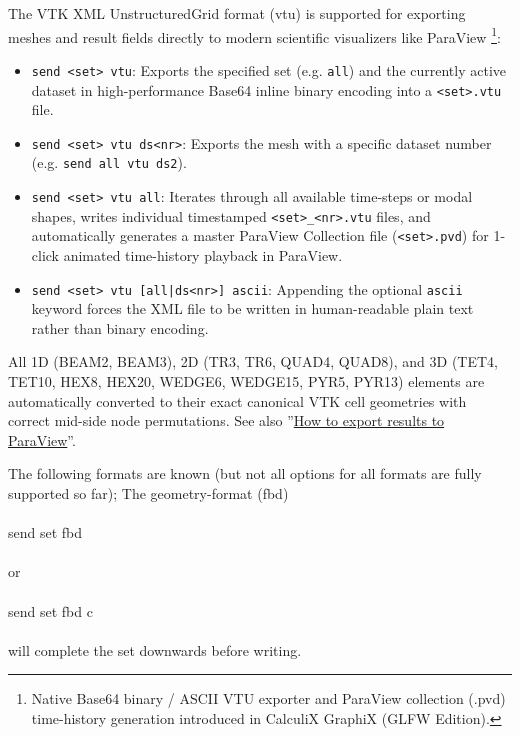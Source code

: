 \documentclass{article}
\providecommand{\htmlref}[2]{\hyperref[#2]{#1}}
\begin{document}
The VTK XML UnstructuredGrid format (vtu) is supported for exporting meshes and result fields directly to modern scientific visualizers like ParaView \cite{paraview}\footnote{Native Base64 binary / ASCII VTU exporter and ParaView collection (.pvd) time-history generation introduced in CalculiX GraphiX (GLFW Edition).}:
\begin{itemize}
\item \texttt{send <set> vtu}: Exports the specified set (e.g. \texttt{all}) and the currently active dataset in high-performance Base64 inline binary encoding into a \texttt{<set>.vtu} file.
\item \texttt{send <set> vtu ds<nr>}: Exports the mesh with a specific dataset number (e.g. \texttt{send all vtu ds2}).
\item \texttt{send <set> vtu all}: Iterates through all available time-steps or modal shapes, writes individual timestamped \texttt{<set>\_<nr>.vtu} files, and automatically generates a master ParaView Collection file (\texttt{<set>.pvd}) for 1-click animated time-history playback in ParaView.
\item \texttt{send <set> vtu [all|ds<nr>] ascii}: Appending the optional \texttt{ascii} keyword forces the XML file to be written in human-readable plain text rather than binary encoding.
\end{itemize}
All 1D (BEAM2, BEAM3), 2D (TR3, TR6, QUAD4, QUAD8), and 3D (TET4, TET10, HEX8, HEX20, WEDGE6, WEDGE15, PYR5, PYR13) elements are automatically converted to their exact canonical VTK cell geometries with correct mid-side node permutations. See also ''\htmlref{How to export results to ParaView}{How to export results to ParaView}''.

The following formats are known (but not all options for all formats are fully supported so far); The geometry-format (fbd)\\\\send set fbd\\\\or\\\\send set fbd c\\\\will complete the set downwards before writing.
\end{document}
